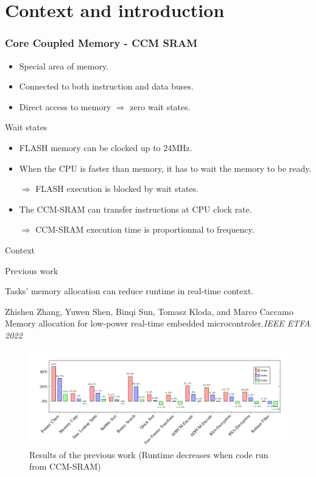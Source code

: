 \documentclass[
	11pt, %
]{beamer}
\begin{document}
\section{Context and introduction}

\begin{frame}
    \frametitle{Core Coupled Memory - CCM SRAM}
	\begin{center}
		
	\end{center}
	\begin{itemize}
	\item Special area of memory. 
	\item Connected to both instruction and data buses.
	\item Direct access to memory $\Rightarrow$ zero wait states.
	\end{itemize}
\end{frame}

\begin{frame}{Wait states}
	\begin{itemize}
	\item FLASH memory can be clocked up to 24MHz.
	\item When the CPU is faster than memory, it has to wait the memory to be ready.
	
	$\Rightarrow$ FLASH execution is blocked by wait states. 
	\item The CCM-SRAM can transfer instructions at CPU clock rate.
	
	$\Rightarrow$ CCM-SRAM execution time is proportionnal to frequency. 
	\end{itemize} 
\end{frame}

\begin{frame}{Context}
	\begin{block}{Previous work}


		
		Tasks' memory allocation can reduce runtime in real-time context.
			\begin{thebibliography}{10}
				{\tiny
				\bibitem{} Zhishen Zhang, Yuwen Shen, Binqi Sun, Tomasz Kloda, and Marco Caccamo
				\newblock Memory allocation for low-power real-time embedded microcontroler.{\em{IEEE ETFA 2022}}
				}
			\end{thebibliography}
	\end{block}
	\begin{figure}
		\centering
		\includegraphics[scale=0.5]{images/boost.png}
		\caption{Results of the previous work (Runtime decreases when code run from CCM-SRAM)}
	\end{figure}
\end{frame}
\end{document}
